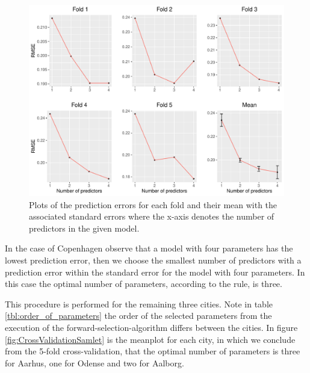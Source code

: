     \begin{figure}[H]
        \centering
      \includegraphics[width = 1 \textwidth]{figures/Nanna/CrossValidationCopenhagen.pdf}
      \caption{Plots of the prediction errors for each fold and their mean with the associated standard errors where the x-axis denotes the number of predictors in the given model.}
      \label{fig:CrossValidationCopenhagen}
    \end{figure}
    
In the case of Copenhagen observe that a model with four parameters has the lowest prediction error, then we choose the smallest number of predictors with a prediction error within the standard error for the model with four parameters.
In this case the optimal number of parameters, according to the rule, is three.

This procedure is performed for the remaining three cities. Note in table \ref{tbl:order_of_parameters} the order of the selected parameters from the execution of the forward-selection-algorithm differs between the cities. 
In figure \ref{fig:CrossValidationSamlet} is the meanplot for each city, in which we conclude from the 5-fold cross-validation, that the optimal number of parameters is three for Aarhus, one for Odense and two for Aalborg.

